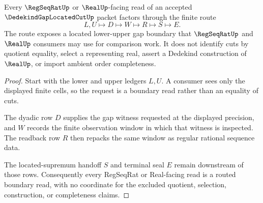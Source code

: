 \begin{theorem}
\label{thm:dedekind-gap-regseqrat-boundary}
Every $\RegSeqRatUp$ or $\RealUp$-facing read of an accepted $\DedekindGapLocatedCutUp$ packet factors through the finite route
$$
L,U \longmapsto D \longmapsto W \longmapsto R \longmapsto S \longmapsto E .
$$
The route exposes a located lower-upper gap boundary that $\RegSeqRatUp$ and $\RealUp$ consumers may use for comparison work. It does not identify cuts by quotient equality, select a representing real, assert a Dedekind construction of $\RealUp$, or import ambient order completeness.
\end{theorem}
\begin{proof}
Start with the lower and upper ledgers $L,U$. A consumer sees only the displayed finite cells, so the request is a boundary read rather than an equality of cuts.

The dyadic row $D$ supplies the gap witness requested at the displayed precision, and $W$ records the finite observation window in which that witness is inspected. The readback row $R$ then repacks the same window as regular rational sequence data.

The located-supremum handoff $S$ and terminal seal $E$ remain downstream of those rows. Consequently every RegSeqRat or Real-facing read is a routed boundary read, with no coordinate for the excluded quotient, selection, construction, or completeness claims.
\end{proof}




